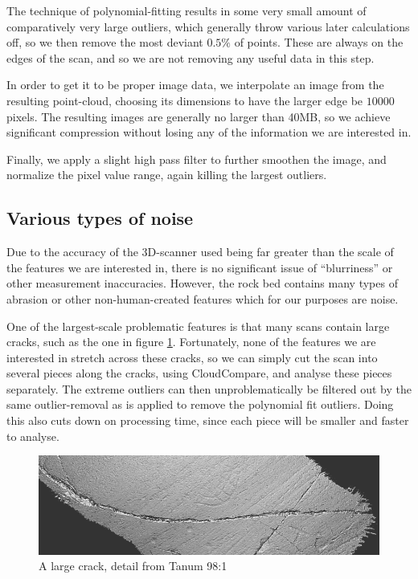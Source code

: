 \documentclass[a4paper,reqno,oneside]{amsart} %
\theoremstyle{definition}
\theoremstyle{remark}
\numberwithin{equation}{section}
\begin{document}
The technique of polynomial-fitting results in some very small amount of comparatively very large outliers, which generally throw various later calculations off, so we then remove the most deviant $0.5\%$ of points. These are always on the edges of the scan, and so we are not removing any useful data in this step.

In order to get it to be proper image data, we interpolate an image from the resulting point-cloud, choosing its dimensions to have the larger edge be $10000$ pixels. The resulting images are generally no larger than 40MB, so we achieve significant compression without losing any of the information we are interested in.

Finally, we apply a slight high pass filter to further smoothen the image, and normalize the pixel value range, again killing the largest outliers.

\subsection{Various types of noise}

Due to the accuracy of the 3D-scanner used being far greater than the scale of the features we are interested in, there is no significant issue of ``blurriness'' or other measurement inaccuracies. However, the rock bed contains many types of abrasion or other non-human-created features which for our purposes are noise.

One of the largest-scale problematic features is that many scans contain large cracks, such as the one in figure \ref{fig:largecrack}. Fortunately, none of the features we are interested in stretch across these cracks, so we can simply cut the scan into several pieces along the cracks, using CloudCompare, and analyse these pieces separately. The extreme outliers can then unproblematically be filtered out by the same outlier-removal as is applied to remove the polynomial fit outliers. Doing this also cuts down on processing time, since each piece will be smaller and faster to analyse.

\begin{figure}[!htb]
\centering
\includegraphics[scale=.5]{largecracks_t98_1.PNG}
\caption{A large crack, detail from Tanum 98:1}
\label{fig:largecrack}
\end{figure}
\end{document}
